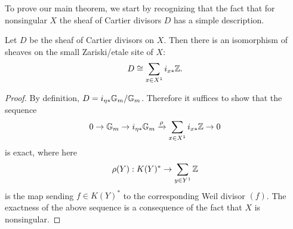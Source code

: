 To prove our main theorem, we start by recognizing that the fact that for nonsingular $X$ the sheaf of Cartier divisors $D$ has a simple description.
\begin{lem}
Let $D$ be the sheaf of Cartier divisors on $X$.  Then there is an isomorphism of sheaves on the small Zariski/etale site of $X$:
$$D\cong \sum_{x\in X^1}i_{x*}\mathbb{Z}.$$
\end{lem}
\begin{proof}
By definition, $D = i_{\eta*}\mathbb{G}_m/\mathbb{G}_m$.  Therefore it suffices to show that the sequence
$$0\rightarrow\mathbb{G}_m\rightarrow i_{\eta*}\mathbb{G}_m \xrightarrow{\rho} \sum_{x\in X^1}i_{x*}\mathbb{Z}\rightarrow 0$$
is exact, where here
$$\rho(Y): K(Y)^*\rightarrow \sum_{y\in Y^1}\mathbb{Z}$$
is the map sending $f\in K(Y)^*$ to the corresponding Weil divisor $(f)$.  The exactness of the above sequence is a consequence of the fact that $X$ is nonsingular.
\end{proof}

